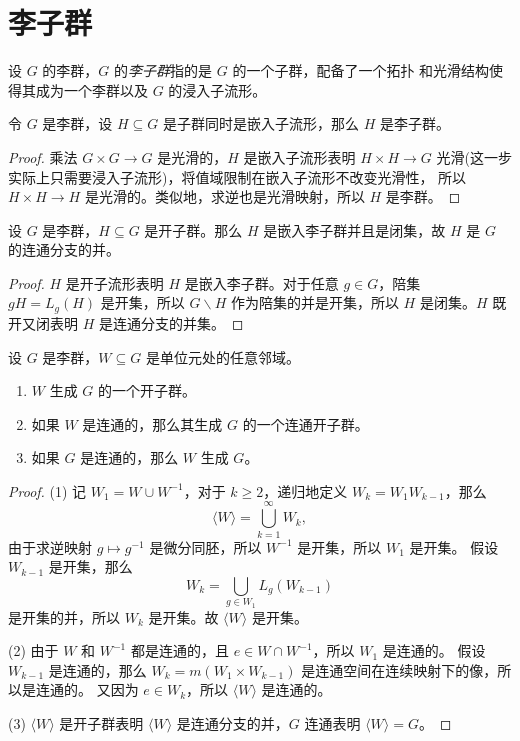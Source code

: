 \section{李子群}

设 $G$ 的李群，$G$ 的\emph{李子群}指的是 $G$ 的一个子群，配备了一个拓扑
和光滑结构使得其成为一个李群以及 $G$ 的浸入子流形。

\begin{proposition}\label{prop:embedding and subgroup is lie subgroup}
  令 $G$ 是李群，设 $H\subseteq G$ 是子群同时是嵌入子流形，那么 $H$ 是李子群。
\end{proposition}
\begin{proof}
  乘法 $G\times G\to G$ 是光滑的，$H$ 是嵌入子流形表明 $H\times H\to G$
  光滑(这一步实际上只需要浸入子流形)，将值域限制在嵌入子流形不改变光滑性，
  所以 $H\times H\to H$ 是光滑的。类似地，求逆也是光滑映射，所以 $H$
  是李群。
\end{proof}

\begin{lemma}
  设 $G$ 是李群，$H\subseteq G$ 是开子群。那么 $H$ 是嵌入李子群并且是闭集，故 $H$
  是 $G$ 的连通分支的并。
\end{lemma}
\begin{proof}
  $H$ 是开子流形表明 $H$ 是嵌入李子群。对于任意 $g\in G$，陪集 $gH=L_g(H)$ 是开集，所以
  $G\smallsetminus H$ 作为陪集的并是开集，所以 $H$ 是闭集。$H$ 既开又闭表明 $H$
  是连通分支的并集。
\end{proof}


\begin{proposition}
  设 $G$ 是李群，$W\subseteq G$ 是单位元处的任意邻域。
  \begin{enumerate}
    \item $W$ 生成 $G$ 的一个开子群。
    \item 如果 $W$ 是连通的，那么其生成 $G$ 的一个连通开子群。
    \item 如果 $G$ 是连通的，那么 $W$ 生成 $G$。
  \end{enumerate}
\end{proposition}
\begin{proof}
  (1) 记 $W_1=W\cup W^{-1}$，对于 $k\geq 2$，递归地定义 $W_k=W_1W_{k-1}$，那么
  \[
    \langle W\rangle=\bigcup_{k=1}^\infty W_k,
  \]
  由于求逆映射 $g\mapsto g^{-1}$ 是微分同胚，所以 $W^{-1}$ 是开集，所以 $W_1$ 是开集。
  假设 $W_{k-1}$ 是开集，那么
  \[
    W_k=\bigcup_{g\in W_1}L_g(W_{k-1})
  \]
  是开集的并，所以 $W_k$ 是开集。故 $\langle W\rangle$ 是开集。

  (2) 由于 $W$ 和 $W^{-1}$ 都是连通的，且 $e\in W\cap W^{-1}$，所以 $W_1$ 是连通的。
  假设 $W_{k-1}$ 是连通的，那么 $W_k=m(W_1\times W_{k-1})$ 是连通空间在连续映射下的像，所以是连通的。
  又因为 $e\in W_k$，所以 $\langle W\rangle$ 是连通的。

  (3) $\langle W\rangle$ 是开子群表明 $\langle W\rangle$ 是连通分支的并，$G$ 连通表明 $\langle W\rangle=G$。
\end{proof}

